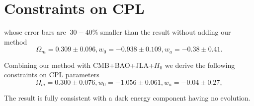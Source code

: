 \documentclass[useAMS,usenatbib]{mnras}
\begin{document}
\section{Constraints on CPL}


whose error bars are $~30-40\%$ smaller than the result without adding our method
\begin{equation}
\Omega_m = 0.309 \pm 0.096, w_0 = -0.938 \pm 0.109, w_a = -0.38 \pm 0.41.
\end{equation}

Combining our method with CMB+BAO+JLA+$H_0$ we derive the following constraints on CPL parameters
\begin{equation}
\Omega_m = 0.300 \pm 0.076, w_0 = -1.056 \pm 0.061, w_a = -0.04 \pm 0.27,
\end{equation}

The result is fully consistent with a dark energy component having no evolution.


\end{document}
